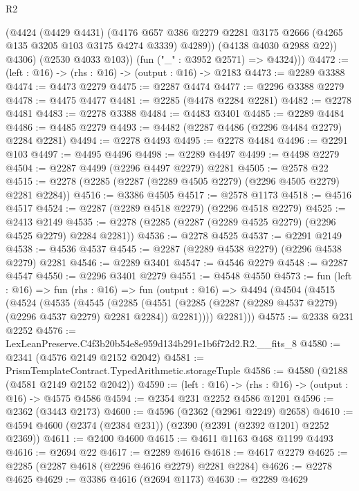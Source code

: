 \begin{lexlean}{R2}
\begin{coremodule}
              (@4424
                (@4429 @4431)
                (@4176
                  @657
                  @386
                  @2279
                  @2281
                  @3175
                  @2666
                  (@4265 @135 @3205 @103 @3175 @4274 @3339)
                  @4289))
              (@4138 @4030 @2988 @22))
            @4306)
          (@2530 @4033 @103))
        (fun ("_" : @3952 @2571) => @4324)))
@4472 := (left : @16) -> (rhs : @16) -> (output : @16) -> @2183
@4473 := @2289 @3388
@4474 := @4473 @2279
@4475 := @2287 @4474
@4477 := @2296 @3388 @2279
@4478 := @4475 @4477
@4481 := @2285 (@4478 @2284 @2281)
@4482 := @2278 @4481
@4483 := @2278 @3388
@4484 := @4483 @3401
@4485 := @2289 @4484
@4486 := @4485 @2279
@4493 := @4482 (@2287 @4486 (@2296 @4484 @2279) @2284 @2281)
@4494 := @2278 @4493
@4495 := @2278 @4484
@4496 := @2291 @103
@4497 := @4495 @4496
@4498 := @2289 @4497
@4499 := @4498 @2279
@4504 := @2287 @4499 (@2296 @4497 @2279) @2281
@4505 := @2578 @22
@4515 := @2278 (@2285 (@2287 (@2289 @4505 @2279) (@2296 @4505 @2279) @2281 @2284))
@4516 := @3386 @4505
@4517 := @2578 @1173
@4518 := @4516 @4517
@4524 := @2287 (@2289 @4518 @2279) (@2296 @4518 @2279)
@4525 := @2413 @2149
@4535 := @2278 (@2285 (@2287 (@2289 @4525 @2279) (@2296 @4525 @2279) @2284 @2281))
@4536 := @2278 @4525
@4537 := @2291 @2149
@4538 := @4536 @4537
@4545 := @2287 (@2289 @4538 @2279) (@2296 @4538 @2279) @2281
@4546 := @2289 @3401
@4547 := @4546 @2279
@4548 := @2287 @4547
@4550 := @2296 @3401 @2279
@4551 := @4548 @4550
@4573 := fun (left : @16) =>
  fun (rhs : @16) =>
  fun (output : @16) =>
  @4494
    (@4504
      (@4515
        (@4524
          (@4535
            (@4545
              (@2285
                (@4551 (@2285 (@2287 (@2289 @4537 @2279) (@2296 @4537 @2279) @2281 @2284)) @2281))))
          @2281)))
@4575 := @2338 @231 @2252
@4576 := LexLeanPreserve.C4f3b20b54e8e959d134b291e1b6f72d2.R2.__fits_8
@4580 := @2341 (@4576 @2149 @2152 @2042)
@4581 := PrismTemplateContract.TypedArithmetic.storageTuple
@4586 := @4580 (@2188 (@4581 @2149 @2152 @2042))
@4590 := (left : @16) -> (rhs : @16) -> (output : @16) -> @4575 @4586
@4594 := @2354 @231 @2252 @4586 @1201
@4596 := @2362 (@3443 @2173)
@4600 := @4596 (@2362 (@2961 @2249) @2658)
@4610 := @4594 @4600 (@2374 (@2384 @231)) (@2390 (@2391 (@2392 @1201) @2252 @2369))
@4611 := @2400 @4600
@4615 := @4611 @1163 @468 @1199 @4493
@4616 := @2694 @22
@4617 := @2289 @4616
@4618 := @4617 @2279
@4625 := @2285 (@2287 @4618 (@2296 @4616 @2279) @2281 @2284)
@4626 := @2278 @4625
@4629 := @3386 @4616 (@2694 @1173)
@4630 := @2289 @4629

\end{coremodule}
\end{lexlean}
